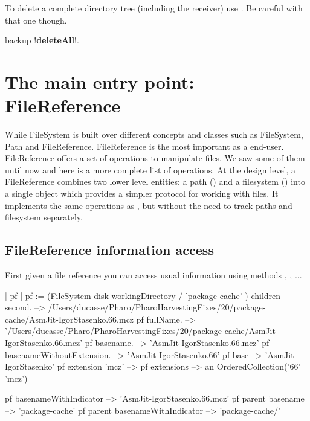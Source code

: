 \documentclass[a4paper,10pt,twoside]{book}
\begin{document}
To delete a complete directory tree (including the receiver) use . Be careful with that one though.

\begin{code}{}
backup !\textbf{deleteAll}!.
\end{code}




\section{The main entry point: FileReference}
While FileSystem is built over different concepts and classes such as FileSystem, Path and FileReference. FileReference is the most important as
a end-user. FileReference offers a set of operations to manipulate files. We saw some of them until now and here is a more complete list of operations.
At the design level, a FileReference combines two lower level entities: a path () and a filesystem () into a single object which provides a simpler protocol for working with files. It implements the same operations as , but without the need to track paths and filesystem separately.

\subsection{FileReference information access}
First given a file reference you can access usual information using methods , , ...

\begin{code}{}
| pf |
pf := (FileSystem disk workingDirectory / 'package-cache' ) children second.
  -->  /Users/ducasse/Pharo/PharoHarvestingFixes/20/package-cache/AsmJit-IgorStasenko.66.mcz
pf fullName.
  --> '/Users/ducasse/Pharo/PharoHarvestingFixes/20/package-cache/AsmJit-IgorStasenko.66.mcz'
pf basename.
  --> 'AsmJit-IgorStasenko.66.mcz'  
pf basenameWithoutExtension. 
  -->	'AsmJit-IgorStasenko.66'
pf base 
	--> 'AsmJit-IgorStasenko'
pf extension 'mcz'
    -->
pf extensions
	--> an OrderedCollection('66' 'mcz')
\end{code}

\begin{code}{}
pf  basenameWithIndicator  
	--> 'AsmJit-IgorStasenko.66.mcz'
pf parent  basename 
	--> 'package-cache'
pf parent basenameWithIndicator  
	--> 'package-cache/'
\end{code}
\end{document}
